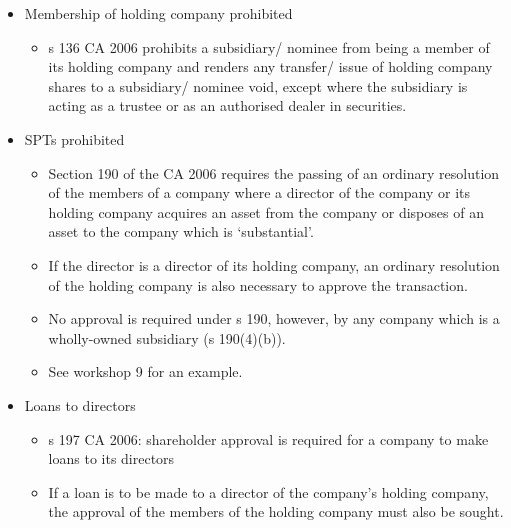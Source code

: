 \documentclass[
]{article}
\providecommand{\tightlist}{%
  \setlength{\itemsep}{0pt}\setlength{\parskip}{0pt}}
\begin{document}
\begin{itemize}
\tightlist
\item
  Membership of holding company prohibited

  \begin{itemize}
  \tightlist
  \item
    s 136 CA 2006 prohibits a subsidiary/ nominee from being a member of
    its holding company and renders any transfer/ issue of holding
    company shares to a subsidiary/ nominee void, except where the
    subsidiary is acting as a trustee or as an authorised dealer in
    securities.
  \end{itemize}
\item
  SPTs prohibited

  \begin{itemize}
  \tightlist
  \item
    Section 190 of the CA 2006 requires the passing of an ordinary
    resolution of the members of a company where a director of the
    company or its holding company acquires an asset from the company or
    disposes of an asset to the company which is `substantial'.
  \item
    If the director is a director of its holding company, an ordinary
    resolution of the holding company is also necessary to approve the
    transaction.
  \item
    No approval is required under s 190, however, by any company which
    is a wholly-owned subsidiary (s 190(4)(b)).
  \item
    See workshop 9 for an example.
  \end{itemize}
\item
  Loans to directors

  \begin{itemize}
  \tightlist
  \item
    s 197 CA 2006: shareholder approval is required for a company to
    make loans to its directors
  \item
    If a loan is to be made to a director of the company's holding
    company, the approval of the members of the holding company must
    also be sought.
  \end{itemize}
\end{itemize}
\end{document}
